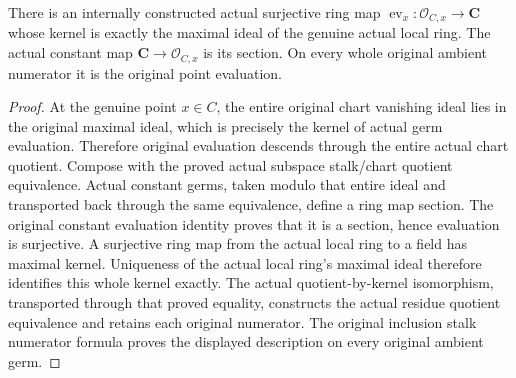 \begin{theorem}
\label{hir:actual-analytic-subspace-stalk-residue-evaluation}
\leanok
There is an internally constructed actual surjective ring map
$\operatorname{ev}_x:\mathcal O_{C,x}\to\mathbf C$ whose kernel is
exactly the maximal ideal of the genuine actual local ring. The actual
constant map $\mathbf C\to\mathcal O_{C,x}$ is its section. On every
whole original ambient numerator it is the original point evaluation.
\end{theorem}
\begin{proof}
At the genuine point $x\in C$, the entire original chart vanishing ideal
lies in the original maximal ideal, which is precisely the kernel of
actual germ evaluation. Therefore original evaluation descends through
the entire actual chart quotient. Compose with the proved actual
subspace stalk/chart quotient equivalence. Actual constant germs,
taken modulo that entire ideal and transported back through the same
equivalence, define a ring map section. The original constant evaluation
identity proves that it is a section, hence evaluation is surjective.
A surjective ring map from the actual local ring to a field has maximal
kernel. Uniqueness of the actual local ring's maximal ideal therefore
identifies this whole kernel exactly. The actual quotient-by-kernel
isomorphism, transported through that proved equality, constructs the
actual residue quotient equivalence and retains each original numerator.
The original inclusion stalk
numerator formula proves the displayed description on every original
ambient germ.
\end{proof}


